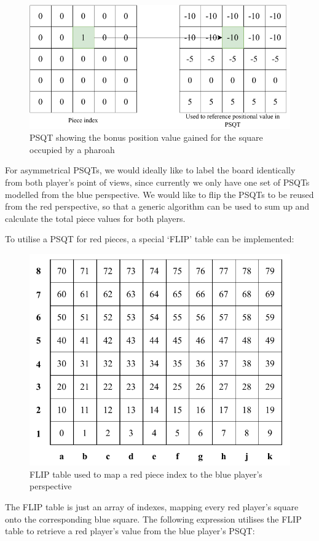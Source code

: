 \documentclass[../main/main.tex]{subfiles}
\begin{document}
\begin{figure}[H]
    \centering
    \includegraphics[width=0.8\columnwidth]{../design/assets/psqt.pdf}
    \caption{PSQT showing the bonus position value gained for the square occupied by a pharoah}
    \label{fig:psqt}
\end{figure}

For asymmetrical PSQTs, we would ideally like to label the board identically from both player’s point of views, since currently we only have one set of PSQTs modelled from the blue perspective. We would like to flip the PSQTs to be reused from the red perspective, so that a generic algorithm can be used to sum up and calculate the total piece values for both players.

To utilise a PSQT for red pieces, a special ‘FLIP’ table can be implemented:

\begin{figure}[H]
    \centering
    \includegraphics[width=0.6\columnwidth]{../design/assets/bitboard_indexes.pdf}
    \caption{FLIP table used to map a red piece index to the blue player's perspective}
    \label{fig:flip-table}
\end{figure}

The FLIP table is just an array of indexes, mapping every red player’s square onto the corresponding blue square. The following expression utilises the FLIP table to retrieve a red player’s value from the blue player’s PSQT:
\end{document}
